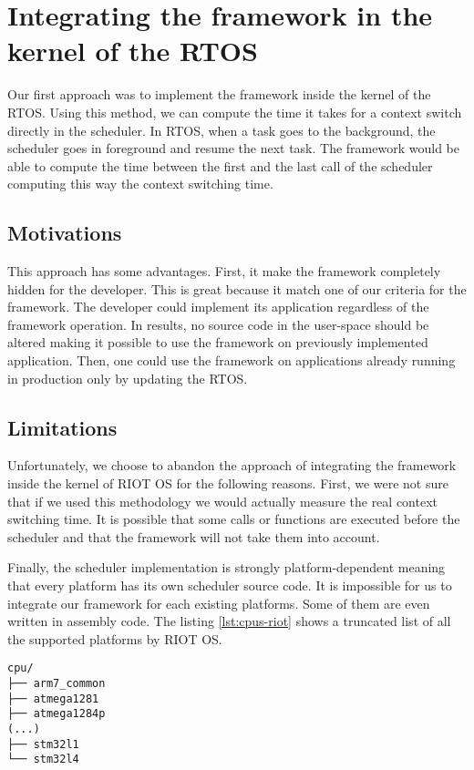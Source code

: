 \section{Integrating the framework in the kernel of the RTOS \label{sec:kernel}}

Our first approach was to implement the framework inside the kernel of the RTOS.
Using this method, we can compute the time it takes for a context switch directly in the scheduler.
In RTOS, when a task goes to the background, the scheduler goes in foreground and resume the next task.
The framework would be able to compute the time between the first and the last call of the scheduler computing this way the context switching time.

\subsection{Motivations}

This approach has some advantages.
First, it make the framework completely hidden for the developer.
This is great because it match one of our criteria for the framework.
The developer could implement its application regardless of the framework operation.
In results, no source code in the user-space should be altered making it possible to use the framework on previously implemented application.
Then, one could use the framework on applications already running in production only by updating the RTOS.

\subsection{Limitations}

Unfortunately, we choose to abandon the approach of integrating the framework inside the kernel of RIOT OS for the following reasons.
First, we were not sure that if we used this methodology we would actually measure the real context switching time.
It is possible that some calls or functions are executed before the scheduler and that the framework will not take them into account.

Finally, the scheduler implementation is strongly platform-dependent meaning that every platform has its own scheduler source code.
It is impossible for us to integrate our framework for each existing platforms.
Some of them are even written in assembly code.
The listing \ref{lst:cpus-riot} shows a truncated list of all the supported platforms by RIOT OS.

\begin{lstlisting}[style=ascii-tree, label={lst:cpus-riot}, caption={Truncated list of platforms supported by RIOT OS}]
cpu/
├── arm7_common
├── atmega1281
├── atmega1284p
(...)
├── stm32l1
└── stm32l4
\end{lstlisting}